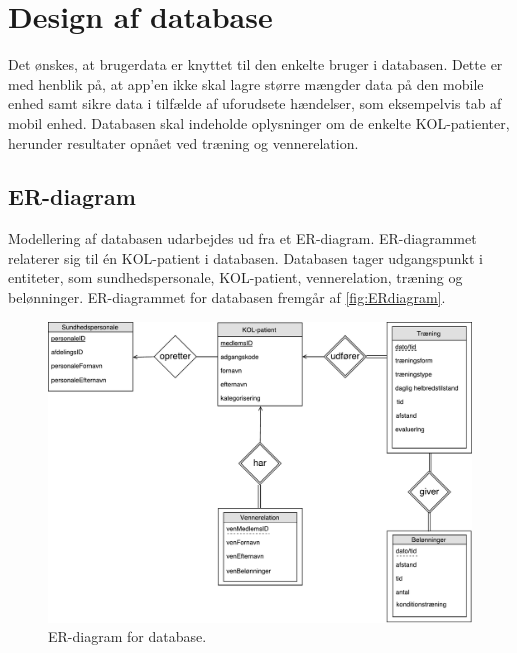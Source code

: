 \section{Design af database} \label{sec:ER}
Det ønskes, at brugerdata er knyttet til den enkelte bruger i databasen. Dette er med henblik på, at app'en ikke skal lagre større mængder data på den mobile enhed samt sikre data i tilfælde af uforudsete hændelser, som eksempelvis tab af mobil enhed. Databasen skal indeholde oplysninger om de enkelte KOL-patienter, herunder resultater opnået ved træning og vennerelation. 

\subsection{ER-diagram}
Modellering af databasen udarbejdes ud fra et ER-diagram. ER-diagrammet relaterer sig til én KOL-patient i databasen. Databasen tager udgangspunkt i entiteter, som sundhedspersonale, KOL-patient, vennerelation, træning og belønninger. ER-diagrammet for databasen fremgår af \autoref{fig:ERdiagram}.


\begin{figure} [H]
\centering
\includegraphics[width=1\textwidth]{figures/Aktivitetsdiagram/ERdiagram}
\caption{ER-diagram for database.}
\label{fig:ERdiagram}
\end{figure} 

